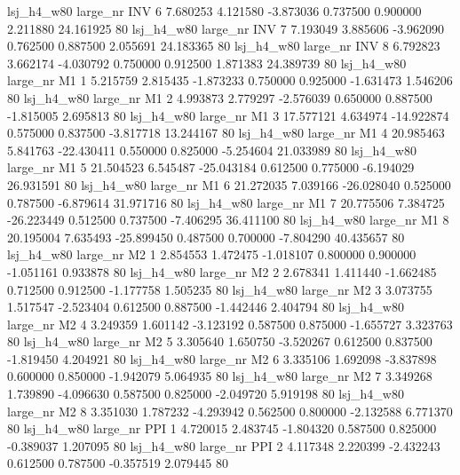   lsj_h4_w80   large_nr      INV                 6  7.680253  4.121580  -3.873036 0.737500 0.900000  2.211880   24.161925 80
  lsj_h4_w80   large_nr      INV                 7  7.193049  3.885606  -3.962090 0.762500 0.887500  2.055691   24.183365 80
  lsj_h4_w80   large_nr      INV                 8  6.792823  3.662174  -4.030792 0.750000 0.912500  1.871383   24.389739 80
  lsj_h4_w80   large_nr       M1                 1  5.215759  2.815435  -1.873233 0.750000 0.925000 -1.631473    1.546206 80
  lsj_h4_w80   large_nr       M1                 2  4.993873  2.779297  -2.576039 0.650000 0.887500 -1.815005    2.695813 80
  lsj_h4_w80   large_nr       M1                 3 17.577121  4.634974 -14.922874 0.575000 0.837500 -3.817718   13.244167 80
  lsj_h4_w80   large_nr       M1                 4 20.985463  5.841763 -22.430411 0.550000 0.825000 -5.254604   21.033989 80
  lsj_h4_w80   large_nr       M1                 5 21.504523  6.545487 -25.043184 0.612500 0.775000 -6.194029   26.931591 80
  lsj_h4_w80   large_nr       M1                 6 21.272035  7.039166 -26.028040 0.525000 0.787500 -6.879614   31.971716 80
  lsj_h4_w80   large_nr       M1                 7 20.775506  7.384725 -26.223449 0.512500 0.737500 -7.406295   36.411100 80
  lsj_h4_w80   large_nr       M1                 8 20.195004  7.635493 -25.899450 0.487500 0.700000 -7.804290   40.435657 80
  lsj_h4_w80   large_nr       M2                 1  2.854553  1.472475  -1.018107 0.800000 0.900000 -1.051161    0.933878 80
  lsj_h4_w80   large_nr       M2                 2  2.678341  1.411440  -1.662485 0.712500 0.912500 -1.177758    1.505235 80
  lsj_h4_w80   large_nr       M2                 3  3.073755  1.517547  -2.523404 0.612500 0.887500 -1.442446    2.404794 80
  lsj_h4_w80   large_nr       M2                 4  3.249359  1.601142  -3.123192 0.587500 0.875000 -1.655727    3.323763 80
  lsj_h4_w80   large_nr       M2                 5  3.305640  1.650750  -3.520267 0.612500 0.837500 -1.819450    4.204921 80
  lsj_h4_w80   large_nr       M2                 6  3.335106  1.692098  -3.837898 0.600000 0.850000 -1.942079    5.064935 80
  lsj_h4_w80   large_nr       M2                 7  3.349268  1.739890  -4.096630 0.587500 0.825000 -2.049720    5.919198 80
  lsj_h4_w80   large_nr       M2                 8  3.351030  1.787232  -4.293942 0.562500 0.800000 -2.132588    6.771370 80
  lsj_h4_w80   large_nr      PPI                 1  4.720015  2.483745  -1.804320 0.587500 0.825000 -0.389037    1.207095 80
  lsj_h4_w80   large_nr      PPI                 2  4.117348  2.220399  -2.432243 0.612500 0.787500 -0.357519    2.079445 80
